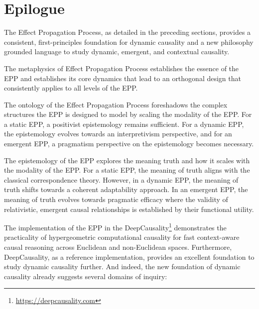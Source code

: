 \section{Epilogue}
\label{sec:epilogue}

 The Effect Propagation Process, as detailed in the preceding sections, provides a consistent, first-principles foundation for dynamic causality and a new philosophy grounded language to study dynamic, emergent, and contextual causality.
 
The metaphysics of Effect Propagation Process establishes the essence of the EPP and establishes its core dynamics that lead to an orthogonal design that consistently applies to all levels of the EPP. 

The ontology of the Effect Propagation Process foreshadows the complex structures the EPP is designed to model by scaling the modality of the EPP. For a static EPP, a positivist epistemology remains sufficient. For a dynamic EPP, the epistemology evolves towards an interpretivism perspective, and for an emergent EPP, a pragmatism perspective on the epistemology becomes necessary.

The epistemology of the EPP explores the meaning truth and how it scales with the modality of the EPP. For a static EPP, the meaning of truth aligns with the classical correspondence theory. However, in a dynamic EPP, the meaning of truth shifts towards a coherent adaptability approach. In an emergent EPP, the meaning of truth evolves towards pragmatic efficacy where the validity of relativistic, emergent causal relationships is established by their functional utility.


The implementation of the EPP in the DeepCausality\footnote{\url{https://deepcausality.com}} demonstrates the practicality of hypergeometric computational causality for fast context-aware causal reasoning across Euclidean and non-Euclidean spaces. Furthermore, DeepCausality, as a reference implementation, provides an excellent foundation to study dynamic causality further. And indeed, the new foundation of dynamic causality already suggests  several domains of inquiry: 

